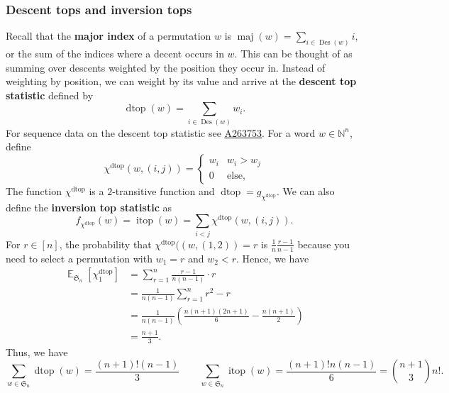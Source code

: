 \documentclass{amsart}
\newcommand{\seqnum}[1]{\href{http://oeis.org/#1}{\underline{#1}}}
\newcommand{\N}{\mathbb{N}}
\renewcommand{\S}{\mathfrak{S}}
\DeclareMathOperator{\Des}{Des}
\DeclareMathOperator{\maj}{maj}
\DeclareMathOperator{\dtop}{dtop}
\DeclareMathOperator{\itop}{itop}
\DeclareMathOperator{\E}{\mathbb{E}}
\newcommand{\lp}{\left(}
\newcommand{\rp}{\right)}
\theoremstyle{definition}
\begin{document}
\subsubsection{Descent tops and inversion tops}
Recall that the \textbf{major index} of a permutation $w$ is  $\maj(w)=\sum_{i\in \Des(w)}i$, or the sum of the indices where a decent occurs in $w$. This can be thought of as summing over descents weighted by the position they occur in. Instead of weighting by position, we can weight by its value and arrive at the \textbf{descent top statistic} defined by
\[\dtop(w)=\sum_{i\in \Des(w)}w_i.\]
For sequence data on the descent top statistic see \seqnum{A263753}. For a word $w\in \N^n$, define 
     \[\chi^{\dtop}(w,(i,j))=\begin{cases}
         w_i&w_i>w_{j}\\
         0&\text{else,}
     \end{cases}\]
     The function $\chi^{\dtop}$ is a $2$-transitive function and $\dtop=g_{\chi^{\dtop}}$. 
     We can also define the \textbf{inversion top statistic} as
     \[f_{\chi^{\dtop}}(w)=\itop(w)=\sum_{i<j}\chi^{\dtop}(w,(i,j)).\]
     For $r\in [n]$, the probability that $\chi^{\dtop}((w,(1,2))=r$ is $\frac{1}{n}\frac{r-1}{n-1}$ because you need to select a permutation with $w_1=r$ and $w_{2}<r$.      Hence, we have
     \begin{align*}   
      \E_{\S_n}[\chi_{1}^{\dtop}]&=\sum_{r=1}^n \frac{r-1}{n(n-1)}\cdot r\\
     &= \frac{1}{n(n-1)}\sum_{r=1}^n r^2-r\\&=\frac{1}{n(n-1)}\lp \frac{n(n+1)(2n+1)}{6}-\frac{n(n+1)}{2}\rp\\&=\frac{n+1}{3}.
     \end{align*}
     Thus, we have
     \begin{equation}\label{eq:ttl-num-of-wdes-winvs}\sum_{w\in \S_n}\dtop(w)=\frac{(n+1)!(n-1)}{3}\qquad \sum_{w\in \S_n}\itop(w)=\frac{(n+1)!n(n-1)}{6}=\binom{n+1}{3}n!.\end{equation}
\end{document}

